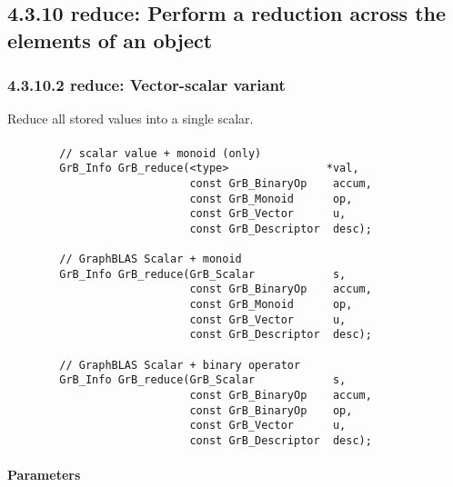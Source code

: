 

\subsection*{4.3.10 {\sf reduce}: Perform a reduction across the elements of an object}


\subsubsection*{4.3.10.2 {\sf reduce}: Vector-scalar variant}

Reduce all stored values into a single scalar.

\paragraph{\syntax}

\begin{verbatim}
        // scalar value + monoid (only)
        GrB_Info GrB_reduce(<type>               *val,
                            const GrB_BinaryOp    accum,
                            const GrB_Monoid      op,
                            const GrB_Vector      u,
                            const GrB_Descriptor  desc);

        // GraphBLAS Scalar + monoid
        GrB_Info GrB_reduce(GrB_Scalar            s,
                            const GrB_BinaryOp    accum,
                            const GrB_Monoid      op,
                            const GrB_Vector      u,
                            const GrB_Descriptor  desc);

        // GraphBLAS Scalar + binary operator
        GrB_Info GrB_reduce(GrB_Scalar            s,
                            const GrB_BinaryOp    accum,
                            const GrB_BinaryOp    op,
                            const GrB_Vector      u,
                            const GrB_Descriptor  desc);
\end{verbatim}

\paragraph{Parameters}

